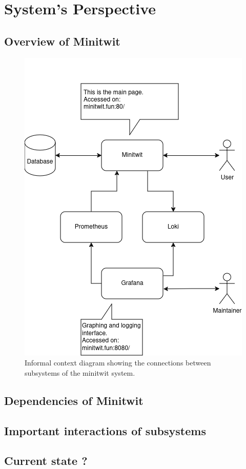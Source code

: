 \section{System's Perspective}
\subsection{Overview of Minitwit}

\begin{figure}
    \centering
    \includegraphics[scale=.5]{img/context_diagram.png}
    \caption{Informal context diagram showing the connections between subsystems of the minitwit system.}
    \label{fig:Informal context diagram}
\end{figure}
\subsection{Dependencies of Minitwit}
\subsection{Important interactions of subsystems}
\subsection{Current state ?}